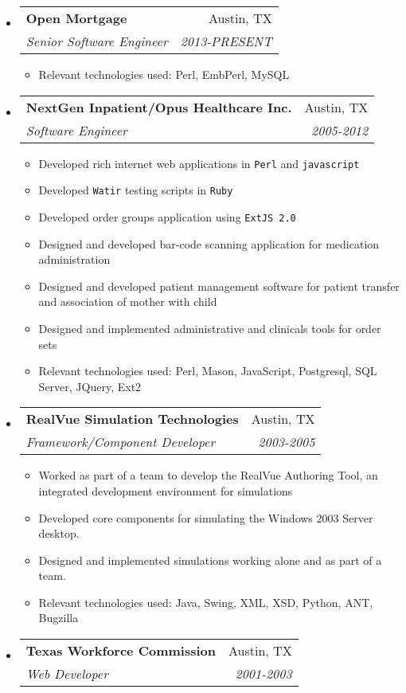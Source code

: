 \documentclass[letterpaper,10pt]{article}
\makeatletter
\newcommand{\resitem}[1]{\item #1 \vspace{-2pt}}
\newcommand{\ressubheading}[4]{

\begin{tabular*}{6.5in}{l@{\cftdotfill{\cftsecdotsep}\extracolsep{\fill}}r}

		\textbf{#1} & #2 \\

		\textit{#3} & \textit{#4} \\

\end{tabular*}\vspace{-6pt}}
\makeatother
\begin{document}
\begin{itemize}

\item
  \ressubheading{Open Mortgage}{Austin, TX}{Senior Software Engineer}{2013-PRESENT}
  \begin{itemize}
    \resitem{Relevant technologies used: Perl, EmbPerl, MySQL}
  \end{itemize}

\item

  \ressubheading{NextGen Inpatient/Opus Healthcare Inc.}{Austin, TX}{Software Engineer}{2005-2012}
  
  \begin{itemize}

    \resitem{Developed rich internet web applications in \texttt{Perl} and \texttt{javascript}}
    \resitem{Developed \texttt{Watir} testing scripts in \texttt{Ruby}}
    \resitem{Developed order groups application using \texttt{ExtJS 2.0}}
    \resitem{Designed and developed bar-code scanning application for medication
         		administration}
    \resitem{Designed and developed patient management software for patient transfer and 
		association of mother with child}
    \resitem{Designed and implemented administrative and clinicals tools for order sets}
    \resitem{Relevant technologies used: Perl, Mason, JavaScript, Postgresql, SQL Server, JQuery, Ext2}

  \end{itemize}

\item

  \ressubheading{RealVue Simulation Technologies}{Austin, TX}{Framework/Component Developer}{2003-2005}

  \begin{itemize}

    \resitem{Worked as part of a team to develop the RealVue Authoring Tool, an
      integrated development environment for simulations}
    \resitem{Developed core components for simulating the Windows 2003 Server desktop.}
    \resitem{Designed and implemented simulations working alone and as part of a team.}
    \resitem{Relevant technologies used: Java, Swing, XML, XSD, Python, ANT, Bugzilla}

  \end{itemize}

\item 

  \ressubheading{Texas Workforce Commission}{Austin, TX}{Web Developer}{2001-2003}
  \begin{itemize}
    

\end{itemize}
\end{itemize}
\end{document}
